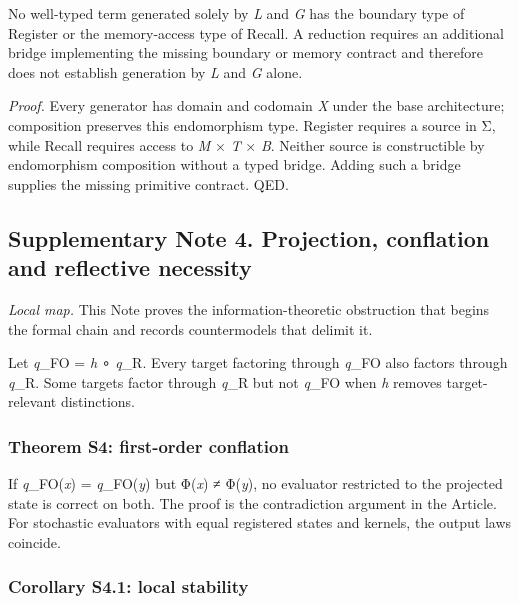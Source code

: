 No well-typed term generated solely by \emph{L} and \emph{G} has the
boundary type of Register or the memory-access type of Recall. A
reduction requires an additional bridge implementing the missing
boundary or memory contract and therefore does not establish generation
by \emph{L} and \emph{G} alone.

\emph{Proof.} Every generator has domain and codomain \emph{X} under the
base architecture; composition preserves this endomorphism type.
Register requires a source in Σ, while Recall requires access to
\emph{M} × \emph{T} × \emph{B}. Neither source is constructible by
endomorphism composition without a typed bridge. Adding such a bridge
supplies the missing primitive contract. QED.

\hypertarget{supplementary-note-4.-projection-conflation-and-reflective-necessity}{%
\subsection{Supplementary Note 4. Projection, conflation and reflective
necessity}\label{supplementary-note-4.-projection-conflation-and-reflective-necessity}}

\emph{Local map.} This Note proves the information-theoretic obstruction
that begins the formal chain and records countermodels that delimit it.

Let \emph{q}\_FO = \emph{h} ∘ \emph{q}\_R. Every target factoring
through \emph{q}\_FO also factors through \emph{q}\_R. Some targets
factor through \emph{q}\_R but not \emph{q}\_FO when \emph{h} removes
target-relevant distinctions.

\hypertarget{theorem-s4-first-order-conflation}{%
\subsubsection{Theorem S4: first-order
conflation}\label{theorem-s4-first-order-conflation}}

If \emph{q}\_FO(\emph{x}) = \emph{q}\_FO(\emph{y}) but Φ(\emph{x}) ≠
Φ(\emph{y}), no evaluator restricted to the projected state is correct
on both. The proof is the contradiction argument in the Article. For
stochastic evaluators with equal registered states and kernels, the
output laws coincide.

\hypertarget{corollary-s4.1-local-stability}{%
\subsubsection{Corollary S4.1: local
stability}\label{corollary-s4.1-local-stability}}


